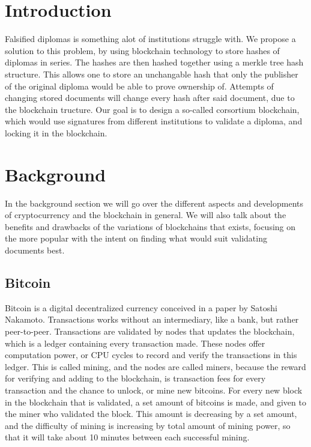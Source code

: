 \documentclass[11pt]{article}
\begin{document}
\tableofcontents

\newpage
{}

\section{Introduction}

Falsified diplomas is something alot of institutions struggle with. We propose a solution to this problem, by using blockchain technology to store hashes of diplomas in series. The hashes are then hashed together using a merkle tree hash structure. This allows one to store an unchangable hash that only the publisher of the original diploma would be able to prove ownership of. Attempts of changing stored documents will change every hash after said document, due to the blockchain tructure. Our goal is to design a so-called corsortium blockchain, which would use signatures from different institutions to validate a diploma, and locking it in the blockchain. 

\section{Background}
In the background section we will go over the different aspects and developments of cryptocurrency and the blockchain in general. We will also talk about the benefits and drawbacks of the variations of blockchains that exists, focusing on the more popular with the intent on finding what would suit validating documents best. 
\subsection{Bitcoin}
  
Bitcoin is a digital decentralized currency conceived in a paper by Satoshi Nakamoto\cite{nakamoto2009bitcoin}. Transactions works without an intermediary, like a bank, but rather peer-to-peer. Transactions are validated by nodes that updates the blockchain, which is a ledger containing every transaction made. These nodes offer computation power, or CPU cycles to record and verify the transactions in this ledger. This is called mining, and the nodes are called miners, because the reward for verifying and adding to the blockchain, is transaction fees for every transaction and the chance to unlock, or mine new bitcoins. For every new block in the blockchain that is validated, a set amount of bitcoins is made, and given to the miner who validated the block. This amount is decreasing by a set amount, and the difficulty of mining is increasing by total amount of mining power, so that it will take about 10 minutes between each successful mining.  
  
\end{document}

